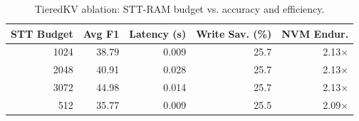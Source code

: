 \begin{table}[h]
\centering\small
\caption{TieredKV ablation: STT-RAM budget vs. accuracy and efficiency.}
\label{tab:stt_ablation}
\begin{tabular}{rrrrr}
\toprule
\textbf{STT Budget} & \textbf{Avg F1} & \textbf{Latency (s)} & \textbf{Write Sav. (\%)} & \textbf{NVM Endur.} \\
\midrule
1024 & 38.79 & 0.009 & 25.7 & 2.13× \\
2048 & 40.91 & 0.028 & 25.7 & 2.13× \\
3072 & 44.98 & 0.014 & 25.7 & 2.13× \\
512 & 35.77 & 0.009 & 25.5 & 2.09× \\
\bottomrule
\end{tabular}
\end{table}
